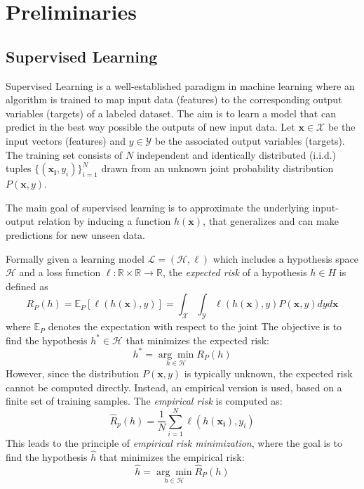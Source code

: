 \chapter{Preliminaries}\label{ch:preliminaries}

\section{Supervised Learning}\label{sec:supervised_leaning}
Supervised Learning is a well-established paradigm in machine learning where an
algorithm is trained to map input data (features) to the corresponding output
variables (targets) of a labeled dataset. The aim is to learn a model that can
predict in the best way possible the outputs of new input data. Let $\mathbf{x}
    \in \mathcal{X}$ be the input vectors (features) and $ y \in \mathcal{Y}$ be
the associated output variables (targets). The training set consists of $N$
independent and identically distributed (i.i.d.) tuples $\{(\mathbf{x_i},
    y_i)\}^N_{i=1}$ drawn from an unknown joint probability distribution
$P(\mathbf{x},y)$.

The main goal of supervised learning is to approximate the underlying
input-output relation by inducing a function $h(\mathbf{x})$, that generalizes
and can make predictions for new unseen data.

Formally given a learning model $\mathcal{L} = (\mathcal{H},\ell)$ which
includes a hypothesis space $\mathcal{H}$ and a loss function $\ell: \mathbb{R}
    \times \mathbb{R} \rightarrow \mathbb{R}$, the \textit{expected risk} of a
hypothesis $h \in H$ is defined as
\begin{equation}
    R_P(h) = \mathbb{E}_P[\ell(h(\mathbf{x}),y)] = \int_{\mathcal{X}} \int_{\mathcal{Y}}
    \ell(h(\mathbf{x}),y)P(\mathbf{x},y)dyd\mathbf{x}
\end{equation}
where $\mathbb{E}_P$ denotes the expectation with respect to the joint
The objective is to find the hypothesis $h^* \in \mathcal{H}$ that minimizes
the expected risk:
\begin{equation}
    h^* = \underset{h \in \mathcal{H}}{\arg\min} R_P(h)
\end{equation}
However, since the distribution $P(\mathbf{x},y)$ is typically unknown, the
expected risk cannot be computed directly. Instead, an empirical version is
used, based on a finite set of training samples. The \textit{empirical risk} is
computed as:
\begin{equation}
    \hat{R}_p(h) = {\frac{1}{N}} \sum^N_{i=1} \ell(h(\mathbf{x_i}),y_i)
\end{equation}
This leads to the principle of \textit{empirical risk minimization}, where the
goal is to find the hypothesis $\hat{h}$ that minimizes the empirical risk:
\begin{equation}
    \hat{h} = \underset{h \in \mathcal{H}}{\arg\min} \hat{R}_P(h)
\end{equation}

